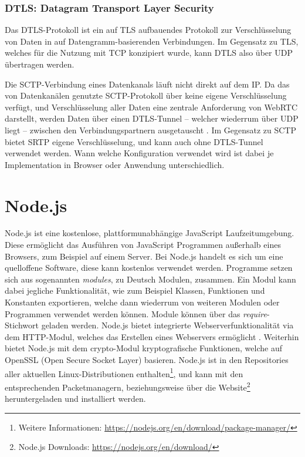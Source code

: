\subsubsection{DTLS: Datagram Transport Layer Security}
Das \acf{DTLS}-Protokoll ist ein auf \acf{TLS} aufbauendes Protokoll zur Verschlüsselung von Daten in auf Datengramm-basierenden Verbindungen. Im Gegensatz zu \acs{TLS}, welches für die Nutzung mit \acs{TCP} konzipiert wurde, kann \acs{DTLS} also über \acs{UDP} übertragen werden.\par

Die \acs{SCTP}-Verbindung eines Datenkanals läuft nicht direkt auf dem \acf{IP}. Da das von Datenkanälen genutzte \acs{SCTP}-Protokoll über keine eigene Verschlüsselung verfügt, und Verschlüsselung aller Daten eine zentrale Anforderung von \acs{WebRTC} darstellt, werden Daten über einen \acs{DTLS}-Tunnel -- welcher wiederrum über \acs{UDP} liegt -- zwischen den Verbindungspartnern ausgetauscht \cite{rtcsecurity}. Im Gegensatz zu \acs{SCTP} bietet \acs{SRTP} eigene Verschlüsselung, und kann auch ohne \acs{DTLS}-Tunnel verwendet werden. Wann welche Konfiguration verwendet wird ist dabei je Implementation in Browser oder Anwendung unterschiedlich.

\section{Node.js}
Node.js ist eine kostenlose, plattformunabhängige JavaScript Laufzeitumgebung.
Diese ermöglicht das Ausführen von JavaScript Programmen außerhalb eines Browsers, zum Beispiel auf einem Server. Bei Node.js handelt es sich um eine quelloffene Software, diese kann kostenlos verwendet werden. Programme setzen sich aus sogenannten \textit{modules}, zu Deutsch Modulen, zusammen. Ein Modul kann dabei jegliche Funktionalität, wie zum Beispiel Klassen, Funktionen und Konstanten exportieren, welche dann wiederrum von weiteren Modulen oder Programmen verwendet werden können. Module können über das \textit{require}-Stichwort geladen werden. Node.js bietet integrierte Webserverfunktionalität via dem \acf{HTTP}-Modul, welches das Erstellen eines Webservers ermöglicht \cite{nod}. Weiterhin bietet Node.js mit dem \glqq{}crypto\grqq{}-Modul kryptografische Funktionen, welche auf OpenSSL (Open Secure Socket Layer) basieren. Node.js ist in den Repositories aller aktuellen Linux-Distributionen enthalten\footnote{Weitere Informationen: \url{https://nodejs.org/en/download/package-manager/}}, und kann mit den entsprechenden Packetmanagern, beziehungsweise über die Website\footnote{Node.js Downloads: \url{https://nodejs.org/en/download/}} heruntergeladen und installiert werden.\par

